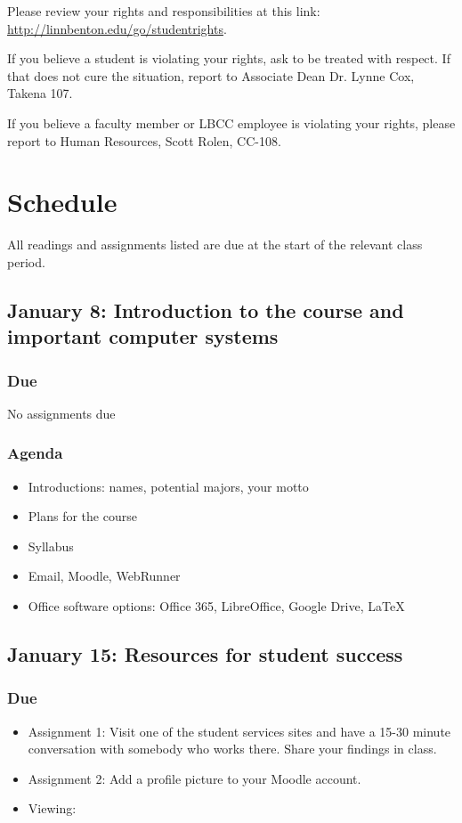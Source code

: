 \documentclass[12pt,article,oneside]{memoir}
\begin{document}
Please review your rights and responsibilities at this link: \url{http://linnbenton.edu/go/studentrights}.

If you believe a student is violating your rights, ask to be treated with respect. If that does not cure the situation, report to Associate Dean Dr. Lynne Cox, Takena 107.

If you believe a faculty member or LBCC employee is violating your rights, please report to Human Resources, Scott Rolen, CC-108.

\newpage

\section{Schedule}

All readings and assignments listed are due at the start of the relevant class period.

\subsection{January 8: Introduction to the course and important computer systems}

\subsubsection{Due}
No assignments due

\subsubsection{Agenda}
\begin{itemize}
 \item Introductions: names, potential majors, your motto
 \item Plans for the course
 \item Syllabus
 \item Email, Moodle, WebRunner
 \item Office software options: Office 365, LibreOffice, Google Drive, \LaTeX
\end{itemize}


\subsection{January 15: Resources for student success}
\subsubsection{Due}
\begin{itemize}
 \item Assignment 1: Visit one of the student services sites and have a 15-30 minute conversation with somebody who works there.  Share your findings in class.
 \item Assignment 2: Add a profile picture to your Moodle account.
 \item Viewing: \cite{tannahill} 
\end{itemize}
\end{document}
